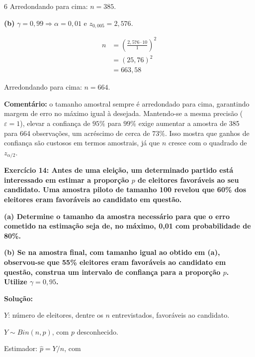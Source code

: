\documentclass[8pt, a4paper, landscape]{extarticle}
\begin{document}
\begin{multicols}{6}
Arredondando para cima: $n = 385$.

\vspace{0.2cm}

\textbf{(b)} $\gamma = 0,99 \Rightarrow \alpha = 0,01$ e $z_{0,005} = 2,576$.

\begin{equation*}
\begin{split}
n &= \left(\frac{2,576 \cdot 10}{1}\right)^2 \\
&= (25,76)^2 \\
&= 663,58
\end{split}
\end{equation*}

Arredondando para cima: $n = 664$.

\vspace{0.2cm}

\textbf{Comentário:} o tamanho amostral sempre é arredondado para cima, garantindo margem de erro no máximo igual à desejada. Mantendo-se a mesma precisão ($\varepsilon = 1$), elevar a confiança de $95\%$ para $99\%$ exige aumentar a amostra de 385 para 664 observações, um acréscimo de cerca de $73\%$. Isso mostra que ganhos de confiança são custosos em termos amostrais, já que $n$ cresce com o quadrado de $z_{\alpha/2}$.

\textbf{Exercício 14: Antes de uma eleição, um determinado partido está interessado em estimar a proporção $p$ de eleitores favoráveis ao seu candidato. Uma amostra piloto de tamanho 100 revelou que 60\% dos eleitores eram favoráveis ao candidato em questão.}

\textbf{(a) Determine o tamanho da amostra necessário para que o erro cometido na estimação seja de, no máximo, 0,01 com probabilidade de 80\%.}

\textbf{(b) Se na amostra final, com tamanho igual ao obtido em (a), observou-se que 55\% eleitores eram favoráveis ao candidato em questão, construa um intervalo de confiança para a proporção $p$. Utilize $\gamma = 0,95$.}

\vspace{0.3cm}

\textbf{Solução:}

$Y$: número de eleitores, dentre os $n$ entrevistados, favoráveis ao candidato.

$Y \sim Bin(n, p)$, com $p$ desconhecido.

Estimador: $\hat{p} = Y/n$, com


\end{multicols}
\end{document}
